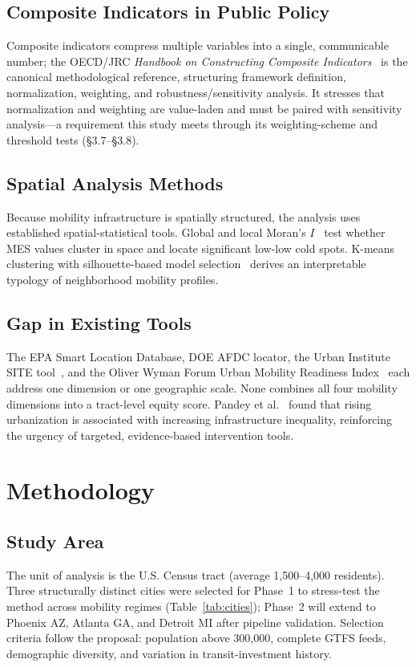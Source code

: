 \documentclass[11pt]{article}
\begin{document}
\subsection{Composite Indicators in Public Policy}
Composite indicators compress multiple variables into a single, communicable
number; the OECD/JRC \emph{Handbook on Constructing Composite
Indicators}~\cite{nardo2008} is the canonical methodological reference,
structuring framework definition, normalization, weighting, and
robustness/sensitivity analysis. It stresses that normalization and weighting are
value-laden and must be paired with sensitivity analysis---a requirement this
study meets through its weighting-scheme and threshold tests (\S3.7--\S3.8).

\subsection{Spatial Analysis Methods}
Because mobility infrastructure is spatially structured, the analysis uses
established spatial-statistical tools. Global and local Moran's
$I$~\cite{anselin1995} test whether MES values cluster in space and locate
significant low-low cold spots. K-means clustering with silhouette-based model
selection~\cite{rousseeuw1987} derives an interpretable typology of neighborhood
mobility profiles.

\subsection{Gap in Existing Tools}
The EPA Smart Location Database, DOE AFDC locator, the Urban Institute SITE
tool~\cite{urbanSITE2025}, and the Oliver Wyman Forum Urban Mobility Readiness
Index~\cite{oliverwyman2024} each address one dimension or one geographic scale.
None combines all four mobility dimensions into a tract-level equity score.
Pandey et al.~\cite{pandey2025} found that rising urbanization is associated with
increasing infrastructure inequality, reinforcing the urgency of targeted,
evidence-based intervention tools.

\section{Methodology}

\subsection{Study Area}
The unit of analysis is the U.S. Census tract (average 1,500--4,000 residents).
Three structurally distinct cities were selected for Phase~1 to stress-test the
method across mobility regimes (Table~\ref{tab:cities}); Phase~2 will extend to
Phoenix AZ, Atlanta GA, and Detroit MI after pipeline validation. Selection
criteria follow the proposal: population above 300,000, complete GTFS feeds,
demographic diversity, and variation in transit-investment history.
\end{document}

